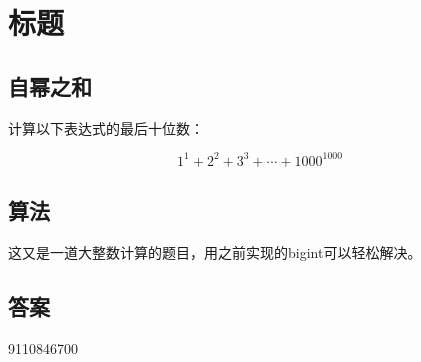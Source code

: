 \section{标题}
\subsection{自幂之和}
\begin{tcolorbox}

计算以下表达式的最后十位数：

\[
1^1 + 2^2 + 3^3 + \cdots + 1000^{1000}
\]


\end{tcolorbox}

\subsection{算法}
这又是一道大整数计算的题目，用之前实现的bigint可以轻松解决。


\subsection{答案}
9110846700
